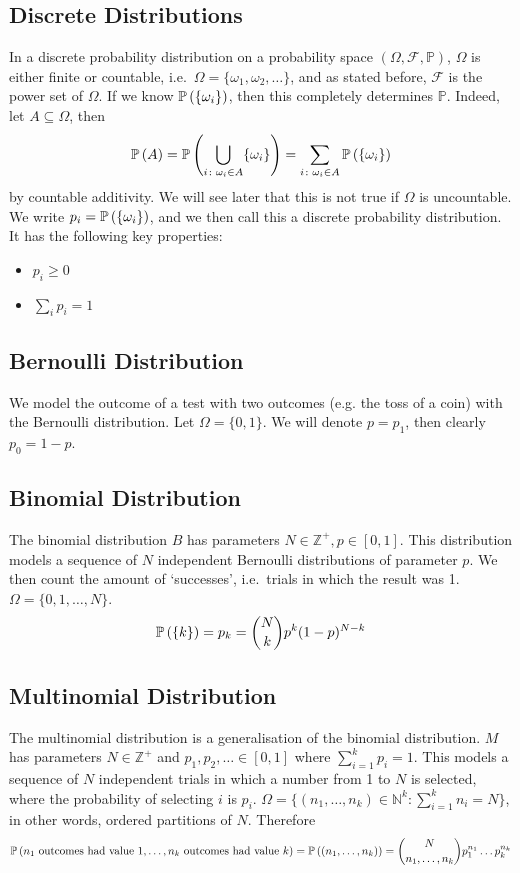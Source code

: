 \subsection{Discrete Distributions}
In a discrete probability distribution on a probability space \((\Omega, \mathcal F, \mathbb P)\), \(\Omega\) is either finite or countable, i.e.\ \(\Omega = \{ \omega_1, \omega_2, \dots \}\), and as stated before, \(\mathcal F\) is the power set of \(\Omega\).
If we know \(\mathbb{P}\left({\{\omega_i\}}\right)\), then this completely determines \(\mathbb P\).
Indeed, let \(A \subseteq \Omega\), then
\[
	\mathbb{P}\left({A}\right) = \mathbb{P}\left({\bigcup_{i \colon \omega_i \in A} \{ \omega_i \}}\right) = \sum_{i \colon \omega_i \in A}\mathbb{P}\left({\{\omega_i\}}\right)
\]
by countable additivity.
We will see later that this is not true if \(\Omega\) is uncountable.
We write \(p_i = \mathbb{P}\left({\{\omega_i\}}\right)\), and we then call this a discrete probability distribution.
It has the following key properties:
\begin{itemize}
	\item \(p_i \geq 0\)
	\item \(\sum_i p_i = 1\)
\end{itemize}

\subsection{Bernoulli Distribution}
We model the outcome of a test with two outcomes (e.g.
the toss of a coin) with the Bernoulli distribution.
Let \(\Omega = \{ 0, 1 \}\).
We will denote \(p = p_1\), then clearly \(p_0 = 1 - p\).

\subsection{Binomial Distribution}
The binomial distribution \(B\) has parameters \(N \in \mathbb Z^+, p \in [0, 1]\).
This distribution models a sequence of \(N\) independent Bernoulli distributions of parameter \(p\).
We then count the amount of `successes', i.e.\ trials in which the result was 1.
\(\Omega = \{ 0, 1, \dots, N \}\).
\[
	\mathbb{P}\left({\{ k \}}\right) = p_k = \binom{N}{k}p^k(1-p)^{N-k}
\]

\subsection{Multinomial Distribution}
The multinomial distribution is a generalisation of the binomial distribution.
\(M\) has parameters \(N \in \mathbb Z^+\) and \(p_1, p_2, \dots \in [0, 1]\) where \(\sum_{i=1}^k p_i = 1\).
This models a sequence of \(N\) independent trials in which a number from 1 to \(N\) is selected, where the probability of selecting \(i\) is \(p_i\).
\(\Omega = \{ (n_1, \dots, n_k) \in \mathbb N^k \colon \sum_{i=1}^k n_i = N \}\), in other words, ordered partitions of \(N\).
Therefore
\[
	\mathbb{P}\left({n_1 \text{ outcomes had value 1}, \dots, n_k \text{ outcomes had value }k}\right) = \mathbb{P}\left({(n_1, \dots, n_k)}\right) = \binom{N}{n_1,\dots,n_k}p_1^{n_1}\dots p_k^{n_k}
\]

